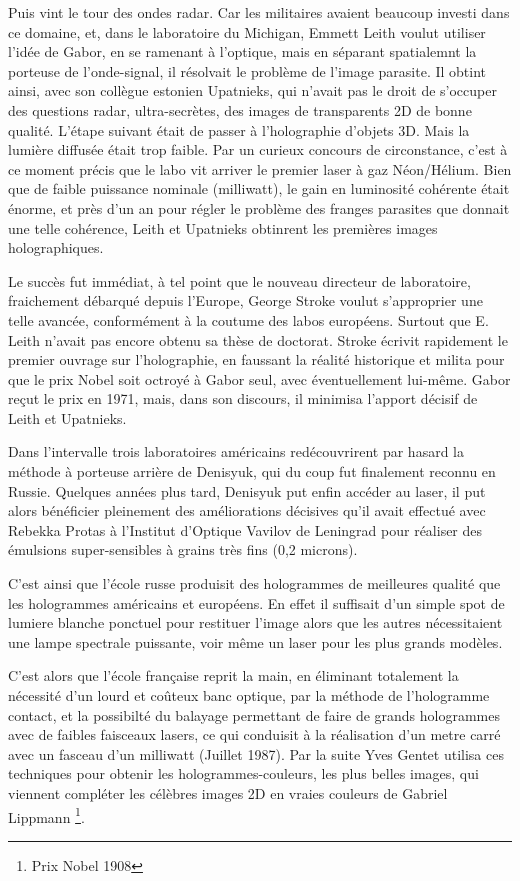 \documentclass[a4paper,12pt]{article}
\begin{document}
Puis vint le tour des ondes radar. Car les militaires avaient beaucoup investi dans ce domaine, et, dans le laboratoire du Michigan, Emmett Leith voulut utiliser l'idée de Gabor, en se ramenant à l'optique, mais en séparant spatialemnt la porteuse de l'onde-signal, il résolvait le problème de l'image parasite. Il obtint ainsi, avec son collègue estonien Upatnieks, qui n'avait pas le droit de s'occuper des questions radar, ultra-secrètes, des images de transparents 2D de bonne qualité. L'étape suivant était de passer à l'holographie d'objets 3D. Mais la lumière diffusée était trop faible. Par un curieux concours de circonstance, c'est à ce moment précis que le labo vit arriver le premier laser à gaz Néon/Hélium. Bien que de faible puissance nominale (milliwatt), le gain en luminosité cohérente était énorme, et près d'un an pour régler le problème des franges parasites que donnait une telle cohérence, Leith et Upatnieks obtinrent les premières images holographiques.


Le succès fut immédiat, à tel point que le nouveau directeur de laboratoire, fraichement débarqué depuis l'Europe, George Stroke voulut s'approprier une telle avancée, conformément à la coutume des labos européens. Surtout que E. Leith n'avait pas encore obtenu sa thèse de doctorat. Stroke écrivit rapidement le premier ouvrage sur l'holographie, en faussant la réalité historique et milita pour que le prix Nobel soit octroyé à Gabor seul, avec éventuellement lui-même. Gabor reçut le prix en 1971, mais, dans son discours, il minimisa l'apport décisif de Leith et Upatnieks.


Dans l'intervalle trois laboratoires américains redécouvrirent par hasard la méthode à porteuse arrière de Denisyuk, qui du coup fut finalement reconnu en Russie. Quelques années plus tard, Denisyuk put enfin accéder au laser, il put alors bénéficier pleinement des améliorations décisives qu'il avait effectué avec Rebekka Protas à l'Institut d'Optique Vavilov de Leningrad pour réaliser des émulsions super-sensibles à grains très fins (0,2 microns). 


C'est ainsi que l'école russe produisit des hologrammes de meilleures qualité que les hologrammes américains et européens. En effet il suffisait d'un simple spot de lumiere blanche ponctuel pour restituer l'image alors que les autres nécessitaient une lampe spectrale puissante, voir m\^eme un laser pour les plus grands modèles.



C'est alors que l'école française reprit la main, en éliminant totalement la nécessité d'un lourd et co\^uteux banc optique, par la méthode de l'hologramme contact, et la possibilté du balayage permettant de faire de grands hologrammes avec de faibles faisceaux lasers, ce qui conduisit à la réalisation d'un metre carré avec un fasceau d'un milliwatt (Juillet 1987). Par la suite Yves Gentet \cite{Gentet} utilisa ces techniques pour obtenir les hologrammes-couleurs, les plus belles images, qui viennent compléter les célèbres images 2D en vraies couleurs de Gabriel Lippmann \footnote{Prix Nobel 1908}. 
\end{document}
